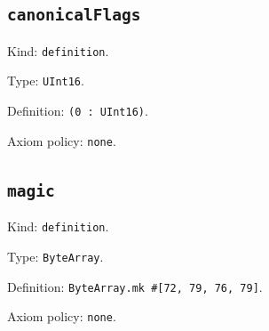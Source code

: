 \documentclass[11pt]{article}
\begin{document}
\subsection*{\texttt{canonicalFlags}}
\noindent Kind: \texttt{definition}.\par
\noindent Type: \texttt{UInt16}.\par
\noindent Definition: \texttt{(0 : UInt16)}.\par
\noindent Axiom policy: \texttt{none}.\par
\subsection*{\texttt{magic}}
\noindent Kind: \texttt{definition}.\par
\noindent Type: \texttt{ByteArray}.\par
\noindent Definition: \texttt{ByteArray.mk \#[72, 79, 76, 79]}.\par
\noindent Axiom policy: \texttt{none}.\par
\end{document}

